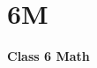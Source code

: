 \label{2 C6 Math}
    \section{6M}
    \begin{frame}
    \begin{center}
    \begin{Huge}
        \textbf{Class 6 Math}
    \end{Huge}
    \end{center}
    \end{frame}
 
    